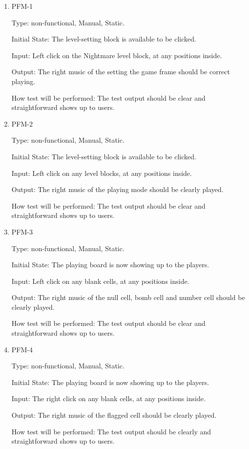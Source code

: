 \documentclass[12pt, titlepage]{article}
\begin{document}
\begin{enumerate}
\item{PFM-1\\}

Type: non-functional, Manual, Static.
					
Initial State: The level-setting block is available to be clicked.
					
Input: Left click on the Nightmare level block, at any positions inside.
					
Output: The right music of the setting the game frame should be correct playing.
					
How test will be performed: The test output should be clear and straightforward shows up to users.

\item{PFM-2\\}

Type: non-functional, Manual, Static.
					
Initial State: The level-setting block is available to be clicked.
					
Input: Left click on any level blocks, at any positions inside.
					
Output: The right music of the playing mode should be clearly played.
					
How test will be performed: The test output should be clear and straightforward shows up to users.

\item{PFM-3\\}

Type: non-functional, Manual, Static.
					
Initial State: The playing board is now showing up to the players.
					
Input: Left click on any blank cells, at any positions inside.
					
Output: The right music of the null cell, bomb cell and number cell should be clearly played.
					
How test will be performed: The test output should be clear and straightforward shows up to users.

\item{PFM-4\\}

Type: non-functional, Manual, Static.
					
Initial State: The playing board is now showing up to the players.
					
Input: The right click on any blank cells, at any positions inside.
					
Output: The right music of the flagged cell should be clearly played.
					
How test will be performed: The test output should be clearly and straightforward shows up to users.

\end{enumerate}
\end{document}
